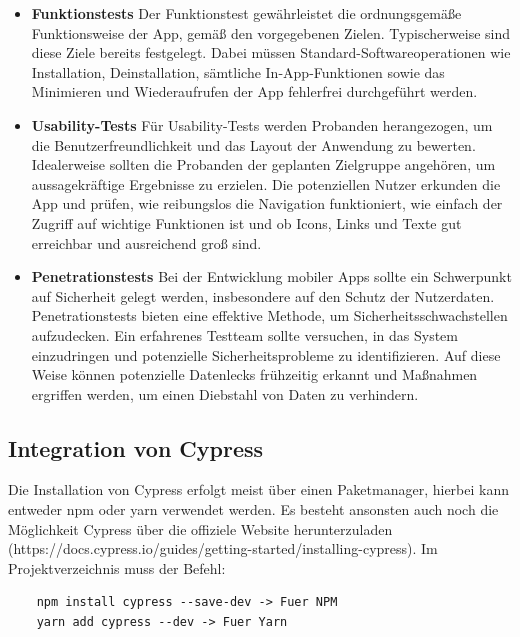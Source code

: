 \begin{itemize}
    \item \textbf{Funktionstests}
        \newline
        Der Funktionstest gewährleistet die ordnungsgemäße Funktionsweise der App, gemäß den vorgegebenen Zielen. Typischerweise sind diese Ziele bereits festgelegt. Dabei müssen Standard-Softwareoperationen wie Installation, Deinstallation, sämtliche In-App-Funktionen sowie das Minimieren und Wiederaufrufen der App fehlerfrei durchgeführt werden.
    \item \textbf{Usability-Tests}
        \newline
        Für Usability-Tests werden Probanden herangezogen, um die Benutzerfreundlichkeit und das Layout der Anwendung zu bewerten. Idealerweise sollten die Probanden der geplanten Zielgruppe angehören, um aussagekräftige Ergebnisse zu erzielen. Die potenziellen Nutzer erkunden die App und prüfen, wie reibungslos die Navigation funktioniert, wie einfach der Zugriff auf wichtige Funktionen ist und ob Icons, Links und Texte gut erreichbar und ausreichend groß sind.
    \item \textbf{Penetrationstests}
        \newline
        Bei der Entwicklung mobiler Apps sollte ein Schwerpunkt auf Sicherheit gelegt werden, insbesondere auf den Schutz der Nutzerdaten. Penetrationstests bieten eine effektive Methode, um Sicherheitsschwachstellen aufzudecken. Ein erfahrenes Testteam sollte versuchen, in das System einzudringen und potenzielle Sicherheitsprobleme zu identifizieren. Auf diese Weise können potenzielle Datenlecks frühzeitig erkannt und Maßnahmen ergriffen werden, um einen Diebstahl von Daten zu verhindern.
\end{itemize}



\subsection{Integration von Cypress}
Die Installation von Cypress erfolgt meist über einen Paketmanager, hierbei kann entweder npm oder yarn verwendet werden. Es besteht ansonsten auch noch die Möglichkeit Cypress über die offiziele Website herunterzuladen (https://docs.cypress.io/guides/getting-started/installing-cypress).
Im Projektverzeichnis muss der Befehl:

\begin{lstlisting}
    npm install cypress --save-dev -> Fuer NPM
    yarn add cypress --dev -> Fuer Yarn
\end{lstlisting}

